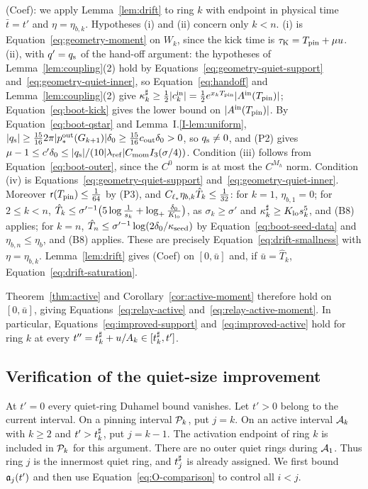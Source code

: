 (Coef): we apply Lemma~\ref{lem:drift} to ring $k$ with endpoint in physical time
$\bar t=t'$ and
$\eta=\eta_{b,k}$. Hypotheses (i) and (ii) concern only $k<n$. (i) is
Equation~\eqref{eq:geometry-moment} on $W_k$, since the kick time is
$\tau_{\mathrm{K}}=T_{\mathrm{pin}}+\mu u$.
(ii), with $q'=q_{\mathrm{s}}$ of the hand-off argument: the hypotheses of Lemma~\ref{lem:coupling}(2) hold
by Equations~\eqref{eq:geometry-quiet-support} and~\eqref{eq:geometry-quiet-inner},
so Equation~\eqref{eq:handoff} and
Lemma~\ref{lem:coupling}(2) give
$\kappa^\sharp_k\ge\frac12|c^{\mathrm{in}}_k|=\frac12e^{x_kT_{\mathrm{pin}}}|A^{\mathrm{in}}(T_{\mathrm{pin}})|$; Equation~\eqref{eq:boot-kick} gives the lower bound on $|A^{\mathrm{in}}(T_{\mathrm{pin}})|$.
By Equation~\eqref{eq:boot-qstar} and Lemma~I.\ref{I-lem:uniform},
$|q_{\mathrm{s}}|\ge\frac{15}{16}2\pi|p^{\mathrm{out}}_*(G_{k+1})|\delta_0\ge\frac{15}{16}c_{\mathrm{out}}\delta_0>0$,
so $q_{\mathrm{s}}\ne0$, and (P2) gives
$\mu-1\le c'\delta_0\le|q_{\mathrm{s}}|/(10|\lambda_{\mathrm{ref}}|C_{\mathrm{mom}}I_{3}(\sigma/4))$.
Condition (iii) follows from Equation~\eqref{eq:boot-outer}, since the $C^0$
norm is at most the $C^{M_h}$ norm. Condition (iv) is
Equations~\eqref{eq:geometry-quiet-support} and~\eqref{eq:geometry-quiet-inner}. Moreover $\mathsf{r}(T_{\mathrm{pin}})\le\frac1{64}$ by (P3), and
$C_{\ell_*}\eta_{b,k}\hat T_k\le\frac1{32}$: for $k=1$, $\eta_{b,1}=0$; for $2\le k<n$,
$\hat T_k\le\sigma'^{-1}\big(5\log\frac1{s_k}+\log_+\frac{\delta_0}{K_{\mathrm{lo}}}\big)$,
as $\sigma_k\ge\sigma'$ and $\kappa^\sharp_k\ge K_{\mathrm{lo}} s_k^5$, and (B8) applies; for
$k=n$, $\hat T_n\le\sigma'^{-1}\log(2\delta_0/\kappa_{\mathrm{seed}})$ by Equation~\eqref{eq:boot-seed-data} and
$\eta_{b,n}\le\eta_b$, and (B8) applies. These are precisely
Equation~\eqref{eq:drift-smallness} with $\eta=\eta_{b,k}$.
Lemma~\ref{lem:drift} gives (Coef) on $[0,\bar u]$ and, if
$\bar u=\hat T_k$, Equation~\eqref{eq:drift-saturation}.

Theorem~\ref{thm:active} and Corollary~\ref{cor:active-moment} therefore hold on
$[0,\bar u]$, giving Equations~\eqref{eq:relay-active} and~\eqref{eq:relay-active-moment}.
In particular, Equations~\eqref{eq:improved-support} and~\eqref{eq:improved-active}
hold for ring $k$ at every $t''=t^\sharp_k+u/A_k\in[t^\sharp_k,t']$.

\subsection{Verification of the quiet-size improvement}
\label{sec:bootstrap-quiet-checks}

At $t'=0$ every quiet-ring Duhamel bound vanishes. Let $t'>0$ belong
to the current interval. On a pinning interval $\mathcal{P}_k$,
put $j=k$. On an active interval $\mathcal{A}_k$ with $k\ge2$ and $t'>t^\sharp_k$, put $j=k-1$.
The activation endpoint of ring $k$ is included in $\mathcal{P}_k$ for this
argument. There are no outer quiet rings during $\mathcal{A}_1$.
Thus ring $j$ is the innermost quiet ring, and $t^\sharp_j$ is already assigned.
We first bound $\mathfrak{a}_j(t')$ and then use Equation~\eqref{eq:O-comparison}
to control all $i<j$.

